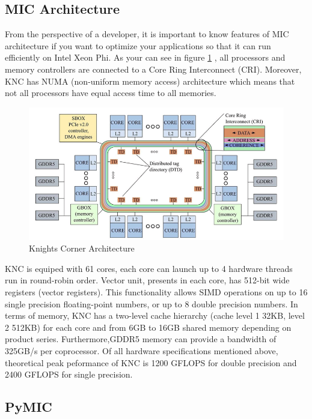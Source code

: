 \subsection{MIC Architecture}

From the perspective of a developer, it is important to know features of MIC architecture if you want to optimize your applications so that it can run efficiently on Intel Xeon Phi. As your can see in figure \ref{fig:arch} \cite{phibook}, all processors and memory controllers are connected to a Core Ring Interconnect (CRI). Moreover, KNC has NUMA (non-uniform memory access) architecture which means that not all processors have equal access time to all memories.

\begin{figure}[h]
\centering
\includegraphics[scale=0.45]{img/mic-arch.png}
\caption{Knights Corner Architecture}
\label{fig:arch}
\end{figure}

KNC is equiped with 61 cores, each core can launch up to 4 hardware threads run in round-robin order. Vector unit, presents in each core, has 512-bit wide registers (vector registers). This functionality allows SIMD operations on up to 16 single precision floating-point numbers, or up to 8 double precision numbers. In terms of memory, KNC has a two-level cache hierarchy (cache level 1 32KB, level 2 512KB) for each core and from 6GB to 16GB shared memory depending on product series. Furthermore,GDDR5 memory can provide a bandwidth of 325GB/s per coprocessor. Of all hardware specifications mentioned above, theoretical peak peformance of KNC is 1200 GFLOPS for double precision and 2400 GFLOPS for single precision.

\subsection{PyMIC}

